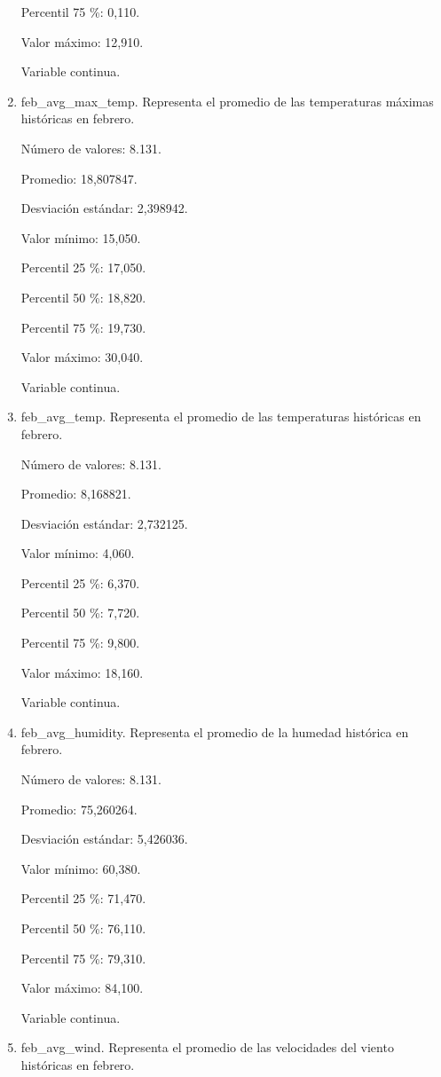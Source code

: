 \begin{enumerate}
	Percentil 75 \%: 0,110.
	
	Valor máximo: 12,910.
	
	Variable continua.

	\item feb\_avg\_max\_temp. Representa el promedio de las temperaturas máximas históricas en febrero.
	
	Número de valores: 8.131.
	
	Promedio: 18,807847.
	
	Desviación estándar: 2,398942.
	
	Valor mínimo: 15,050.
	
	Percentil 25 \%: 17,050.
	
	Percentil 50 \%: 18,820.
	
	Percentil 75 \%: 19,730.
	
	Valor máximo: 30,040.
	
	Variable continua.

	\item feb\_avg\_temp. Representa el promedio de las temperaturas históricas en febrero.
	
	Número de valores: 8.131.
	
	Promedio: 8,168821.
	
	Desviación estándar: 2,732125.
	
	Valor mínimo: 4,060.
	
	Percentil 25 \%: 6,370.
	
	Percentil 50 \%: 7,720.
	
	Percentil 75 \%: 9,800.
	
	Valor máximo: 18,160.
	
	Variable continua.

	\item feb\_avg\_humidity. Representa el promedio de la humedad histórica en febrero.
	
	Número de valores: 8.131.
	
	Promedio: 75,260264.
	
	Desviación estándar: 5,426036.
	
	Valor mínimo: 60,380.
	
	Percentil 25 \%: 71,470.
	
	Percentil 50 \%: 76,110.
	
	Percentil 75 \%: 79,310.
	
	Valor máximo: 84,100.
	
	Variable continua.

	\item feb\_avg\_wind. Representa el promedio de las velocidades del viento históricas en febrero.
	

\end{enumerate}
